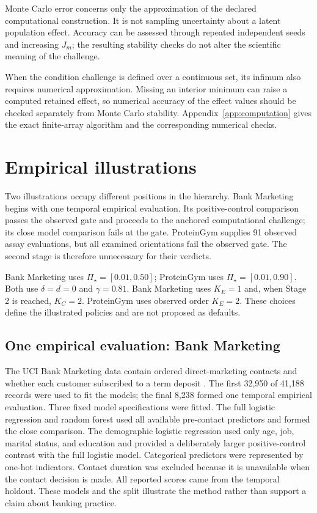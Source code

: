 \documentclass[11pt]{article}
\newcommand{\PSet}{\Pi_\star}
\theoremstyle{remark}
\begin{document}
Monte Carlo error concerns only the approximation of the declared
computational construction. It is not sampling uncertainty about a latent
population effect. Accuracy can be assessed through repeated independent seeds
and increasing $J_m$; the resulting stability checks do not alter the
scientific meaning of the challenge.

When the condition challenge is defined over a continuous set, its infimum
also requires numerical approximation. Missing an interior minimum can raise a
computed retained effect, so numerical accuracy of the effect values should be
checked separately from Monte Carlo stability. Appendix~\ref{app:computation}
gives the exact finite-array algorithm and the corresponding numerical checks.

\section{Empirical illustrations}
\label{sec:illustrations}

Two illustrations occupy different positions in the hierarchy. Bank
Marketing begins with one temporal empirical evaluation. Its positive-control
comparison passes the observed gate and proceeds to the anchored computational
challenge; its close model comparison fails at the gate. ProteinGym supplies
91 observed assay evaluations, but all examined orientations fail the observed
gate. The second stage is therefore unnecessary for their verdicts.

Bank Marketing uses $\PSet=[0.01,0.50]$; ProteinGym uses
$\PSet=[0.01,0.90]$. Both use $\delta=d=0$ and $\gamma=0.81$. Bank
Marketing uses $K_E=1$ and, when Stage 2 is reached, $K_C=2$. ProteinGym
uses observed order $K_E=2$. These choices define the illustrated policies
and are not proposed as defaults.

\subsection{One empirical evaluation: Bank Marketing}
\label{sec:bank-illustration}

The UCI Bank Marketing data contain ordered direct-marketing contacts and
whether each customer subscribed to a term deposit \cite{moro2014bank}. The
first 32,950 of 41,188 records were used to fit the models; the final 8,238
formed one temporal empirical evaluation. Three fixed model specifications were
fitted. The full logistic regression and random forest used all available
pre-contact predictors and formed the close comparison. The demographic
logistic regression used only age, job, marital status, and education and
provided a deliberately larger positive-control contrast with the full
logistic model. Categorical predictors were represented by one-hot indicators.
Contact duration was excluded because it is unavailable when the contact
decision is made. All reported scores came from the temporal holdout. These
models and the split illustrate the method rather than support a claim about
banking practice.
\end{document}
